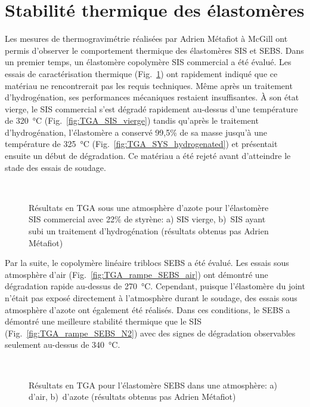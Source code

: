 \section{Stabilité thermique des élastomères}

Les mesures de thermogravimétrie réalisées par Adrien Métafiot à McGill ont permis d'observer le comportement thermique des élastomères SIS et SEBS. 
Dans un premier temps, un élastomère copolymère SIS commercial a été évalué. 
Les essais de caractérisation thermique (Fig.~\ref{fig:TGA_SIS}) ont rapidement indiqué que ce matériau ne rencontrerait pas les requis techniques. 
Même après un traitement d'hydrogénation, ses performances mécaniques restaient insuffisantes. 
À son état vierge, le SIS commercial s'est dégradé rapidement au-dessus d'une température de \SI[locale=FR]{320}{\celsius} (Fig.~\ref{fig:TGA_SIS_vierge}) tandis qu'après le traitement d'hydrogénation, l'élastomère a conservé 99,5\% de sa masse jusqu'à une température de \SI[locale=FR]{325}{\celsius} (Fig.~\ref{fig:TGA_SYS_hydrogenated}) et présentait ensuite un début de dégradation.  
Ce matériau a été rejeté avant d'atteindre le stade des essais de soudage. 

\begin{figure}[h]
	\centering
	\\
	\caption{Résultats en TGA sous une atmosphère d'azote pour l'élastomère SIS commercial avec 22\% de styrène: a) SIS vierge, b)~SIS ayant subi un traitement d'hydrogénation (résultats obtenus pas Adrien Métafiot)}
	\label{fig:TGA_SIS}
\end{figure}

Par la suite, le copolymère linéaire triblocs SEBS a été évalué. 
Les essais sous atmosphère d'air (Fig.~\ref{fig:TGA_rampe_SEBS_air}) ont démontré une dégradation rapide au-dessus de \SI[locale=FR]{270}{\celsius}. 
Cependant, puisque l'élastomère du joint n'était pas exposé directement à l'atmosphère durant le soudage, des essais sous atmosphère d'azote ont également été réalisés. 
Dans ces conditions, le SEBS a démontré une meilleure stabilité thermique que le SIS (Fig.~\ref{fig:TGA_rampe_SEBS_N2}) avec des signes de dégradation observables seulement au-dessus de \SI[locale=FR]{340}{\celsius}. 

\begin{figure}[h]
	\centering
	\\
	\caption{Résultats en TGA pour l'élastomère SEBS dans une atmosphère: a) d'air, b)~d'azote (résultats obtenus pas Adrien Métafiot)}
	\label{fig:TGA_rampe_SEBS}
\end{figure}

